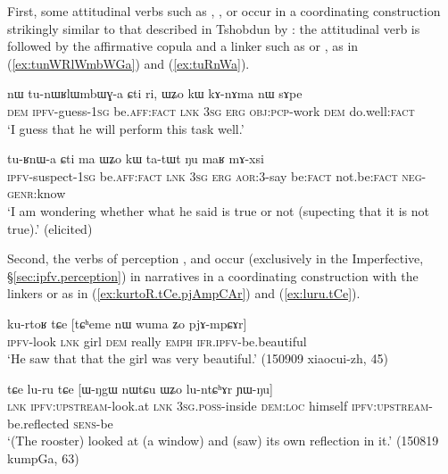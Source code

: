 First, some attitudinal verbs such as , ,  or  occur in a coordinating construction strikingly similar to that described in Tshobdun  by \citet[487--488]{sun12complementation}: the attitudinal verb is followed by the affirmative copula  and a linker such as  or , as in (\ref{ex:tunWRlWmbWGa}) and (\ref{ex:tuRnWa}).

\begin{exe}
	\ex \label{ex:tunWRlWmbWGa}
	\gll nɯ tu-nɯʁlɯmbɯɣ-a ɕti ri, ɯʑo kɯ kɤ-nɤma nɯ sɤpe \\
	\textsc{dem} \textsc{ipfv}-guess-\textsc{1sg} be.\textsc{aff}:\textsc{fact} \textsc{lnk} \textsc{3sg} \textsc{erg} \textsc{obj}:\textsc{pcp}-work \textsc{dem} do.well:\textsc{fact} \\
	\glt `I guess that he will perform this task well.'
\end{exe}

\begin{exe}
	\ex \label{ex:tuRnWa}
	\gll tu-ʁnɯ-a ɕti ma ɯʑo kɯ ta-tɯt ŋu maʁ mɤ-xsi \\
	\textsc{ipfv}-suspect-\textsc{1sg} be.\textsc{aff}:\textsc{fact} \textsc{lnk} \textsc{3sg} \textsc{erg} \textsc{aor}:3\flobv{}-say be:\textsc{fact} not.be:\textsc{fact} \textsc{neg}-\textsc{genr}:know \\
	\glt `I am wondering whether what he said is true or not (supecting that it is not true).' (elicited)
\end{exe}

Second, the verbs of perception  ,   and  occur (exclusively in the Imperfective, §\ref{sec:ipfv.perception}) in narratives in a coordinating construction with the linkers  or  as in (\ref{ex:kurtoR.tCe.pjAmpCAr}) and (\ref{ex:luru.tCe}). 

\begin{exe}
	\ex \label{ex:kurtoR.tCe.pjAmpCAr}
	\gll  ku-rtoʁ tɕe [tɕʰeme nɯ wuma ʑo pjɤ-mpɕɤr] \\
	\textsc{ipfv}-look \textsc{lnk} girl \textsc{dem} really \textsc{emph} \textsc{ifr}.\textsc{ipfv}-be.beautiful \\
	\glt `He saw that that the girl was very beautiful.' (150909 xiaocui-zh, 45)
\end{exe}

\begin{exe}
	\ex \label{ex:luru.tCe}
	\gll tɕe lu-ru tɕe [ɯ-ŋgɯ nɯtɕu ɯʑo lu-ntɕʰɤr ɲɯ-ŋu] \\
	\textsc{lnk} \textsc{ipfv}:\textsc{upstream}-look.at  \textsc{lnk}  \textsc{3sg}.\textsc{poss}-inside \textsc{dem}:\textsc{loc} himself \textsc{ipfv}:\textsc{upstream}-be.reflected \textsc{sens}-be \\
	\glt `(The rooster) looked at (a window) and (saw) its own reflection in it.' (150819 kumpGa, 63)
\end{exe}

